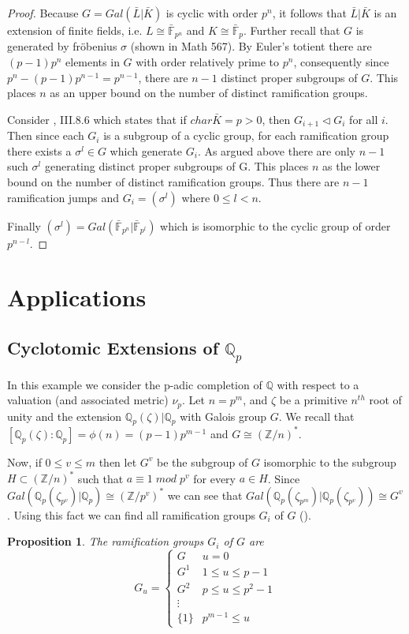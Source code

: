\documentclass[paper=a4, fontsize=11pt]{scrartcl} %
\numberwithin{equation}{section} %
\numberwithin{figure}{section} %
\numberwithin{table}{section} %
\theoremstyle{break}
\newtheorem{prop}{Proposition}
\begin{document}
\begin{proof}
 Because $G=Gal(\bar{L}|\bar{K})$ is cyclic with order $p^n$, it follows that $\bar{L}|\bar{K}$ is an extension of finite fields, i.e. $L\cong \bar{\mathbb{F}}_{p^n}$ and $K\cong \bar{\mathbb{F}}_p$. Further recall that $G$ is generated by fr\"{o}benius $\sigma$ (shown in Math 567). By Euler's totient there are $(p-1)p^n$ elements in $G$ with order relatively prime to $p^n$, consequently since $p^n-(p-1)p^{n-1}=p^{n-1}$, there are $n-1$ distinct proper subgroups of $G$. This places $n$ as an upper bound on the number of distinct ramification groups.

Consider \cite{stitchenoth}, III.8.6 which states that if $char{\bar{K}} =p>0$, then $G_{i+1} \triangleleft G_i$ for all $i$. Then since each $G_i$ is a subgroup of a cyclic group, for each ramification group there exists a $\sigma^l\in G$ which generate $G_i$. As argued above there are only $n-1$ such $\sigma^{l}$ generating distinct proper subgroups of G. This places $n$ as the lower bound on the number of distinct ramification groups. Thus there are $n-1$ ramification jumps and $G_i = (\sigma^l)$ where $0 \leq l < n$.

Finally $(\sigma^l)=Gal(\bar{\mathbb{F}}_{p^n}|\bar{\mathbb{F}}_{p^l})$ which is isomorphic to the cyclic group of order $p^{n-l}$.
\end{proof}

\section{Applications}
\subsection{Cyclotomic Extensions of $\mathbb{Q}_p$}
In this example we consider the p-adic completion of $\mathbb{Q}$ with respect to a valuation (and associated metric) $\nu_p$. Let $n=p^m$, and $\zeta$ be a primitive $n^{th}$ root of unity and the extension $\mathbb{Q}_p(\zeta)|\mathbb{Q}_p$ with Galois group $G$. We recall that $[\mathbb{Q}_p(\zeta):\mathbb{Q}_p]=\phi(n)=(p-1)p^{m-1}$ and $G\cong (\mathbb{Z}/n)^*$. 

Now, if $0 \leq v \leq m$ then let $G^v$ be the subgroup of $G$ isomorphic to the subgroup $H \subset (\mathbb{Z}/n)^*$ such that $a \equiv 1\;mod\;p^v$ for every $a\in H$. Since $Gal(\mathbb{Q}_p(\zeta_{p^v})|\mathbb{Q}_p) \cong (\mathbb{Z}/p^v)^*$ we can see that $Gal(\mathbb{Q}_p(\zeta_{p^m})|\mathbb{Q}_p(\zeta_{p^v})) \cong G^v$. Using this fact we can find all ramification groups $G_i$ of $G$ (\cite{Serre}).
\begin{prop}
The ramification groups $G_i$ of $G$ are
\[ G_u = \begin{cases} 
      G    & u=0 \\
      G^1  & 1 \leq u \leq p -1 \\
      G^2  & p \leq u \leq p^2 -1\\
      \vdots \\
      \{1\} & p^{m-1} \leq u
   \end{cases}
\]
\end{prop}
\end{document}
